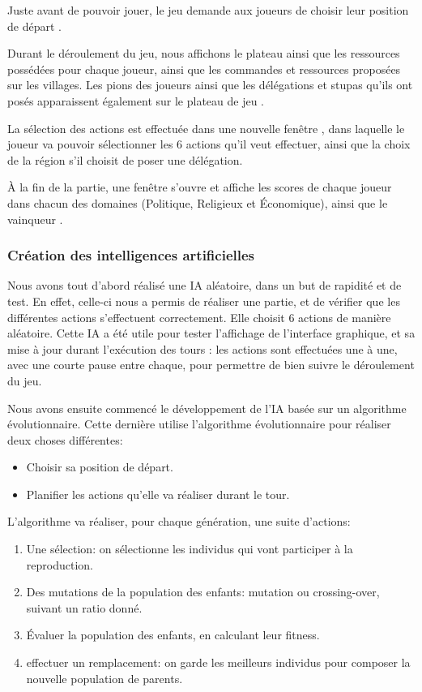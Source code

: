 		Juste avant de pouvoir jouer, le jeu demande aux joueurs de choisir leur position de départ .
		
		Durant le déroulement du jeu, nous affichons le plateau ainsi que les ressources
		possédées pour chaque joueur, ainsi que les commandes et ressources proposées sur
		les villages. Les pions des joueurs ainsi que les délégations et stupas qu'ils ont posés
		apparaissent également sur le plateau de jeu .
		
		La sélection des actions est effectuée dans une nouvelle fenêtre , dans laquelle
		le joueur va pouvoir sélectionner les 6 actions qu'il veut effectuer, ainsi que
		la choix de la région s'il choisit de poser une délégation.
		
		À la fin de la partie, une fenêtre s'ouvre et affiche les scores de chaque joueur
		dans chacun des domaines (Politique, Religieux et Économique), ainsi que le vainqueur .
			
	\subsubsection{Création des intelligences artificielles}
	
		Nous avons tout d'abord réalisé une IA aléatoire, dans un but de rapidité et de test.
		En effet, celle-ci nous a permis de réaliser une partie, et de vérifier que les différentes actions 
		s'effectuent correctement. Elle choisit 6 actions de manière aléatoire.
		Cette IA a été utile pour tester l'affichage de l'interface graphique, et sa
		mise à jour durant l'exécution des tours : les actions sont effectuées une
		à une, avec une courte pause entre chaque, pour permettre de bien suivre le déroulement du jeu.
		
		Nous avons ensuite commencé le développement de l'IA basée sur un algorithme évolutionnaire.
		Cette dernière utilise l'algorithme évolutionnaire pour réaliser deux choses différentes:
		\begin{itemize}
			\item Choisir sa position de départ.
			\item Planifier les actions qu'elle va réaliser durant le tour.
		\end{itemize}
		
		L'algorithme va réaliser, pour chaque génération, une suite d'actions:
		\begin{enumerate}
			\item Une sélection: on sélectionne les individus qui vont participer à la reproduction.
			\item Des mutations de la population des enfants: mutation ou crossing-over, suivant un ratio donné.
			\item Évaluer la population des enfants, en calculant leur fitness.
			\item effectuer un remplacement: on garde les meilleurs individus pour composer la nouvelle population de parents.
		\end{enumerate}
		
		